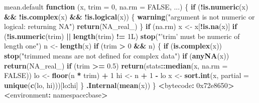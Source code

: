 \documentclass[10pt,a4paper]{book}
\newenvironment{Shaded}{\begin{snugshade}}{\end{snugshade}}
\newcommand{\KeywordTok}[1]{\textcolor[rgb]{0.13,0.29,0.53}{\textbf{#1}}}
\newcommand{\DataTypeTok}[1]{\textcolor[rgb]{0.13,0.29,0.53}{#1}}
\newcommand{\DecValTok}[1]{\textcolor[rgb]{0.00,0.00,0.81}{#1}}
\newcommand{\FloatTok}[1]{\textcolor[rgb]{0.00,0.00,0.81}{#1}}
\newcommand{\StringTok}[1]{\textcolor[rgb]{0.31,0.60,0.02}{#1}}
\newcommand{\OtherTok}[1]{\textcolor[rgb]{0.56,0.35,0.01}{#1}}
\newcommand{\ControlFlowTok}[1]{\textcolor[rgb]{0.13,0.29,0.53}{\textbf{#1}}}
\newcommand{\OperatorTok}[1]{\textcolor[rgb]{0.81,0.36,0.00}{\textbf{#1}}}
\newcommand{\ErrorTok}[1]{\textcolor[rgb]{0.64,0.00,0.00}{\textbf{#1}}}
\newcommand{\NormalTok}[1]{#1}
\begin{document}
\begin{Shaded}
\begin{Highlighting}[]
\NormalTok{mean.default}
\ControlFlowTok{function}\NormalTok{ (x, }\DataTypeTok{trim =} \DecValTok{0}\NormalTok{, }\DataTypeTok{na.rm =} \OtherTok{FALSE}\NormalTok{, ...) }
\NormalTok{\{}
    \ControlFlowTok{if}\NormalTok{ (}\OperatorTok{!}\KeywordTok{is.numeric}\NormalTok{(x) }\OperatorTok{&&}\StringTok{ }\OperatorTok{!}\KeywordTok{is.complex}\NormalTok{(x) }\OperatorTok{&&}\StringTok{ }\OperatorTok{!}\KeywordTok{is.logical}\NormalTok{(x)) \{}
        \KeywordTok{warning}\NormalTok{(}\StringTok{"argument is not numeric or logical: returning NA"}\NormalTok{)}
        \KeywordTok{return}\NormalTok{(}\OtherTok{NA_real_}\NormalTok{)}
\NormalTok{    \}}
    \ControlFlowTok{if}\NormalTok{ (na.rm) }
\NormalTok{        x <-}\StringTok{ }\NormalTok{x[}\OperatorTok{!}\KeywordTok{is.na}\NormalTok{(x)]}
    \ControlFlowTok{if}\NormalTok{ (}\OperatorTok{!}\KeywordTok{is.numeric}\NormalTok{(trim) }\OperatorTok{||}\StringTok{ }\KeywordTok{length}\NormalTok{(trim) }\OperatorTok{!=}\StringTok{ }\NormalTok{1L) }
        \KeywordTok{stop}\NormalTok{(}\StringTok{"'trim' must be numeric of length one"}\NormalTok{)}
\NormalTok{    n <-}\StringTok{ }\KeywordTok{length}\NormalTok{(x)}
    \ControlFlowTok{if}\NormalTok{ (trim }\OperatorTok{>}\StringTok{ }\DecValTok{0} \OperatorTok{&&}\StringTok{ }\NormalTok{n) \{}
        \ControlFlowTok{if}\NormalTok{ (}\KeywordTok{is.complex}\NormalTok{(x)) }
            \KeywordTok{stop}\NormalTok{(}\StringTok{"trimmed means are not defined for complex data"}\NormalTok{)}
        \ControlFlowTok{if}\NormalTok{ (}\KeywordTok{anyNA}\NormalTok{(x)) }
            \KeywordTok{return}\NormalTok{(}\OtherTok{NA_real_}\NormalTok{)}
        \ControlFlowTok{if}\NormalTok{ (trim }\OperatorTok{>=}\StringTok{ }\FloatTok{0.5}\NormalTok{) }
            \KeywordTok{return}\NormalTok{(stats}\OperatorTok{::}\KeywordTok{median}\NormalTok{(x, }\DataTypeTok{na.rm =} \OtherTok{FALSE}\NormalTok{))}
\NormalTok{        lo <-}\StringTok{ }\KeywordTok{floor}\NormalTok{(n }\OperatorTok{*}\StringTok{ }\NormalTok{trim) }\OperatorTok{+}\StringTok{ }\DecValTok{1}
\NormalTok{        hi <-}\StringTok{ }\NormalTok{n }\OperatorTok{+}\StringTok{ }\DecValTok{1} \OperatorTok{-}\StringTok{ }\NormalTok{lo}
\NormalTok{        x <-}\StringTok{ }\KeywordTok{sort.int}\NormalTok{(x, }\DataTypeTok{partial =} \KeywordTok{unique}\NormalTok{(}\KeywordTok{c}\NormalTok{(lo, hi)))[lo}\OperatorTok{:}\NormalTok{hi]}
\NormalTok{    \}}
    \KeywordTok{.Internal}\NormalTok{(}\KeywordTok{mean}\NormalTok{(x))}
\NormalTok{\}}
\OperatorTok{<}\NormalTok{bytecode}\OperatorTok{:}\StringTok{ }\DecValTok{0x72e8650}\OperatorTok{>}
\ErrorTok{<}\NormalTok{environment}\OperatorTok{:}\StringTok{ }\NormalTok{namespace}\OperatorTok{:}\NormalTok{base}\OperatorTok{>}
\end{Highlighting}
\end{Shaded}
\end{document}
